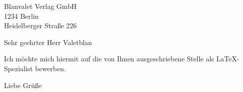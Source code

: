 \documentclass{scrlttr2}
\begin{document}
\begin{letter}{Blanvalet Verlag GmbH\\1234 Berlin\\Heidelberger Straße 226}
	\opening{Sehr geehrter Herr Valetblan}
	Ich möchte mich hiermit auf die von Ihnen ausgeschriebene Stelle als \LaTeX-Spezialist bewerben.
	\closing{Liebe Grüße}
\end{letter}
\end{document}

